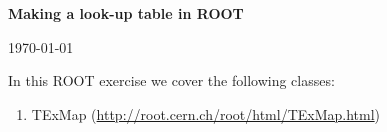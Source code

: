 \documentclass[11pt]{article}
\begin{document}
\begin{center}
\Large{\bf{Making a look-up table in ROOT}}\\
\end{center}
\begin{center}
{\small\today}
\end{center}

\bigskip

\noindent In this ROOT exercise we cover the following classes:
%
\begin{enumerate}
	\item TExMap (\url{http://root.cern.ch/root/html/TExMap.html})
\end{enumerate} 
%

\bigskip\bigskip
\end{document}
